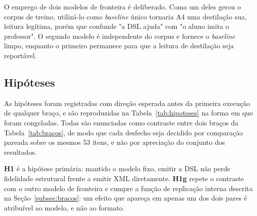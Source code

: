 O emprego de dois modelos de fronteira é deliberado. Como um deles gerou o corpus de treino, utilizá-lo como \textit{baseline} único tornaria A4 uma destilação sua, leitura legítima, porém que confunde "a DSL ajuda" com "o aluno imita o professor". O segundo modelo é independente do corpus e fornece o \textit{baseline} limpo, enquanto o primeiro permanece para que a leitura de destilação seja reportável.

\subsection{Hipóteses}
\label{subsec:hipoteses}

As hipóteses foram registradas com direção esperada antes da primeira execução de qualquer braço, e são reproduzidas na Tabela~\ref{tab:hipoteses} na forma em que foram congeladas. Todas são enunciadas como contraste entre dois braços da Tabela~\ref{tab:bracos}, de modo que cada desfecho seja decidido por comparação pareada sobre os mesmos 53 itens, e não por apreciação do conjunto dos resultados.

\begin{table}[h!]
\end{table}

\textbf{H1} é a hipótese primária: mantido o modelo fixo, emitir a DSL não perde fidelidade estrutural frente a emitir XML diretamente. \textbf{H1g} repete o contraste com o outro modelo de fronteira e cumpre a função de replicação interna descrita na Seção~\ref{subsec:bracos}: um efeito que apareça em apenas um dos dois pares é atribuível ao modelo, e não ao formato.

